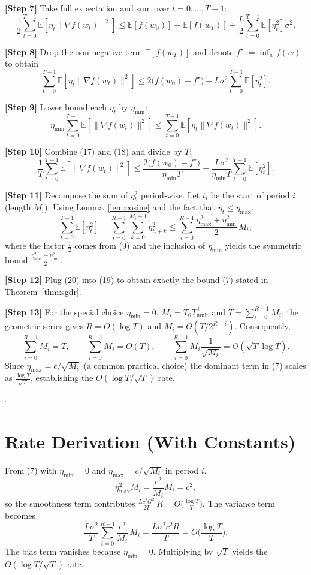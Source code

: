 \documentclass{article}
\newcommand{\E}{\mathbb{E}}
\begin{document}
\noindent\textbf{[Step 7]} Take full expectation and sum over $t=0,\dots,T-1$:
\[
\frac12\sum_{t=0}^{T-1}\E[\eta_t\|\nabla f(w_t)\|^2]
\le \E[f(w_0)]- \E[f(w_T)]
+\frac{L}{2}\sum_{t=0}^{T-1}\E[\eta_t^2]\sigma^2.
\tag{16}
\]

\noindent\textbf{[Step 8]} Drop the non‑negative term $\E[f(w_T)]$ and denote $f^\star:=\inf_w f(w)$ to obtain
\[
\sum_{t=0}^{T-1}\E[\eta_t\|\nabla f(w_t)\|^2]
\le 2\bigl(f(w_0)-f^\star\bigr)
+ L\sigma^2\sum_{t=0}^{T-1}\E[\eta_t^2].
\tag{17}
\]

\noindent\textbf{[Step 9]} Lower bound each $\eta_t$ by $\eta_{\min}$:
\[
\eta_{\min}\sum_{t=0}^{T-1}\E[\|\nabla f(w_t)\|^2]
\le \sum_{t=0}^{T-1}\E[\eta_t\|\nabla f(w_t)\|^2].
\tag{18}
\]

\noindent\textbf{[Step 10]} Combine (17) and (18) and divide by $T$:
\[
\frac{1}{T}\sum_{t=0}^{T-1}\E[\|\nabla f(w_t)\|^2]
\le
\frac{2\bigl(f(w_0)-f^\star\bigr)}{\eta_{\min}T}
+\frac{L\sigma^2}{\eta_{\min}T}\sum_{t=0}^{T-1}\E[\eta_t^2].
\tag{19}
\]

\noindent\textbf{[Step 11]} Decompose the sum of $\eta_t^2$ period‑wise. Let $t_i$ be the start of period $i$ (length $M_i$). Using Lemma~\ref{lem:cosine} and the fact that $\eta_t\le\eta_{\max}$,
\[
\sum_{t=0}^{T-1}\E[\eta_t^2]
= \sum_{i=0}^{R-1}\sum_{k=0}^{M_i-1}\eta_{t_i+k}^2
\le \sum_{i=0}^{R-1}\frac{\eta_{\max}^2+\eta_{\min}^2}{2}\,M_i,
\tag{20}
\]
where the factor $\frac12$ comes from (9) and the inclusion of $\eta_{\min}$ yields the symmetric bound $\frac{\eta_{\max}^2+\eta_{\min}^2}{2}$.

\noindent\textbf{[Step 12]} Plug (20) into (19) to obtain exactly the bound (7) stated in Theorem~\ref{thm:sgdr}.

\noindent\textbf{[Step 13]} For the special choice $\eta_{\min}=0$, $M_i=T_0T_{\text{mult}}^{\,i}$ and $T=\sum_{i=0}^{R-1}M_i$, the geometric series gives $R=O(\log T)$ and $M_i=O(T/2^{R-i})$. Consequently,
\[
\sum_{i=0}^{R-1}M_i = T,\qquad
\sum_{i=0}^{R-1}M_i = O(T),\qquad
\sum_{i=0}^{R-1}M_i \frac{1}{\sqrt{M_i}} = O(\sqrt{T}\log T).
\]
Since $\eta_{\max}=c/\sqrt{M_i}$ (a common practical choice) the dominant term in (7) scales as $\frac{\log T}{\sqrt{T}}$, establishing the $O(\log T/\sqrt{T})$ rate.

\hfill $\square$

\section*{Rate Derivation (With Constants)}
From (7) with $\eta_{\min}=0$ and $\eta_{\max}=c/\sqrt{M_i}$ in period $i$,
\[
\eta_{\max}^2 M_i = \frac{c^2}{M_i}M_i = c^2,
\]
so the smoothness term contributes $\frac{L c^2 G^2}{2T}\,R = O\!\bigl(\frac{\log T}{T}\bigr)$.  
The variance term becomes
\[
\frac{L\sigma^2}{T}\sum_{i=0}^{R-1}\frac{c^2}{M_i}\,M_i
= \frac{L\sigma^2 c^2 R}{T}=O\!\bigl(\frac{\log T}{T}\bigr).
\]
The bias term vanishes because $\eta_{\min}=0$. Multiplying by $\sqrt{T}$ yields the $O(\log T/\sqrt{T})$ rate.
\end{document}
